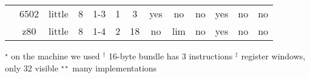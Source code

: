 \begin{sidewaystable}[tbp]
\begin{sf}
\begin{footnotesize}
\begin{center}
\begin{tabular}{|c|c||c|c|c|c|c|c|c|c|c|c|c|}
		 & %
6502             & %
little           & %
8                & %
1-3              & %
1                & %
3                & %
yes              & %
no               & %
no               & %
yes              & %
no               & %
no                 %
\\
\cline{2-13}


                 & %
z80              & %
little           & %
8                & %
1-4              & %
2                & %
18               & %
no               & %
lim              & %
no 		 & %
yes              & %
no               & %
no                 %
\\
\cline{2-13}

\hline

\end{tabular}

$^{\star}$ on the machine we used \hspace{2em}$^{\dagger}$ 16-byte bundle has 3 instructions
\hspace{3em}$^{\ddagger}$ register windows, only 32 visible
\hspace{2em}$^{\star\star}$ many implementations
\end{center}
\end{footnotesize}
\end{sf}
\end{sidewaystable}
